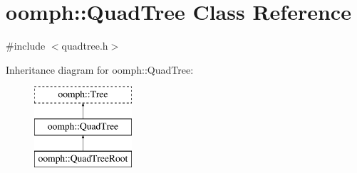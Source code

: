 \hypertarget{classoomph_1_1QuadTree}{}\section{oomph\+:\+:Quad\+Tree Class Reference}
\label{classoomph_1_1QuadTree}


{\ttfamily \#include $<$quadtree.\+h$>$}

Inheritance diagram for oomph\+:\+:Quad\+Tree\+:\begin{figure}[H]
\begin{center}
\leavevmode
\includegraphics[height=3.000000cm]{classoomph_1_1QuadTree}
\end{center}
\end{figure}
